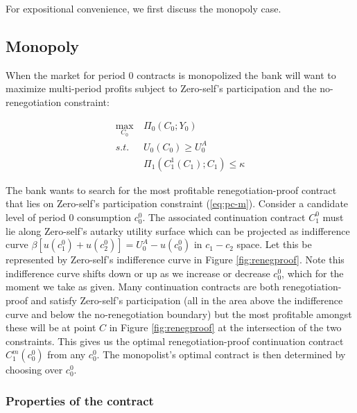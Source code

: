 \documentclass[11pt,english]{article}
\theoremstyle{plain}
\theoremstyle{definition}
\begin{document}
For expositional convenience, we first discuss the monopoly case.

\subsection{Monopoly}

When the market for period 0 contracts is monopolized the bank will
want to maximize multi-period profits subject to Zero-self's participation
and the no-renegotiation constraint:

\begin{align}
\max_{C_{0}} & \ \Pi_{0}\left(C_{0};Y_{0}\right)\\
s.t. & \ U_{0}\left(C_{0}\right)\geq U_{0}^{A}\label{eq:pc-m}\\
 & \ \Pi_{1}\left(C_{1}^{1}\left(C_{1}\right);C_{1}\right)\leq\kappa\label{eq:rpc-m}
\end{align}


The bank wants to search for the most profitable renegotiation-proof
contract that lies on Zero-self's participation constraint (\ref{eq:pc-m}).
Consider a candidate level of period 0 consumption $c_{0}^{0}$. The
associated continuation contract $C_{1}^{0}$ must lie along Zero-self's
autarky utility surface which can be projected as indifference curve
$\beta\left[u(c_{1}^{0})+u(c_{2}^{0})\right]=U_{0}^{A}-u(c_{0}^{0})$
in $c_{1}-c_{2}$ space. Let this be represented by Zero-self's indifference
curve in Figure \ref{fig:renegproof}. Note this indifference curve
shifts down or up as we increase or decrease $c_{0}^{0}$, which for
the moment we take as given. Many continuation contracts are both
renegotiation-proof and satisfy Zero-self's participation (all in
the area above the indifference curve and below the no-renegotiation
boundary) but the most profitable amongst these will be at point $C$
in Figure \ref{fig:renegproof} at the intersection of the two constraints.
This gives us the optimal renegotiation-proof continuation contract
$C_{1}^{m}(c_{0}^{0})$ from any $c_{0}^{0}$. The monopolist's optimal
contract is then determined by choosing over $c_{0}^{0}$.

\subsubsection{Properties of the contract}

\label{sec_contract_properties}
\end{document}
